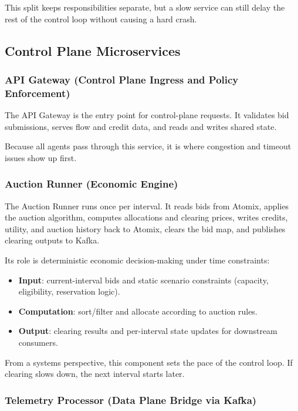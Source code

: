 This split keeps responsibilities separate, but a slow service can still delay the rest of the control loop without causing a hard crash.

\subsection{Control Plane Microservices}

\subsubsection{API Gateway (Control Plane Ingress and Policy Enforcement)}

The API Gateway is the entry point for control-plane requests. It validates bid submissions, serves flow and credit data, and reads and writes shared state.

Because all agents pass through this service, it is where congestion and timeout issues show up first.

\subsubsection{Auction Runner (Economic Engine)}

The Auction Runner runs once per interval. It reads bids from Atomix, applies the auction algorithm, computes allocations and clearing prices, writes credits, utility, and auction history back to Atomix, clears the bid map, and publishes clearing outputs to Kafka.

Its role is deterministic economic decision-making under time constraints:

\begin{itemize}
    \item \textbf{Input}: current-interval bids and static scenario constraints (capacity, eligibility, reservation logic).
    \item \textbf{Computation}: sort/filter and allocate according to auction rules.
    \item \textbf{Output}: clearing results and per-interval state updates for downstream consumers.
\end{itemize}

From a systems perspective, this component sets the pace of the control loop. If clearing slows down, the next interval starts later.

\subsubsection{Telemetry Processor (Data Plane Bridge via Kafka)}

